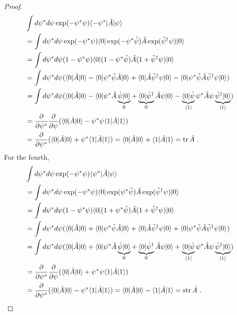 \begin{proof}
\begin{equation*}
\begin{aligned}
            & \int d\psi^* d\psi \exp(-\psi^* \psi) \langle-\psi^*\vert  \hat A \vert\psi\rangle \\ & = \int d\psi^* d\psi \exp(-\psi^* \psi)  \langle0\vert \exp(- \psi^* \hat \psi) \hat A \exp(\hat \psi^\dagger \psi) \vert0\rangle \\ & = \int d\psi^* d\psi (1 - \psi^* \psi) \langle0\vert (1 - \psi^* \hat \psi) \hat A (1 + \hat \psi^\dagger \psi) \vert0\rangle \\ & = \int d\psi^* d\psi (\langle0\vert \hat A \vert0\rangle - \langle0\vert \psi^* \hat \psi \hat A \vert0\rangle + \langle0\vert \hat A \hat \psi^\dagger \psi \vert0\rangle - \langle0\vert \psi^* \hat \psi \hat A \hat \psi^\dagger \psi \vert0\rangle) \\ & = \int d\psi^* d\psi (\langle0\vert \hat A \vert0\rangle - \langle0\vert \psi^* \hat A \underbrace{\hat \psi \vert0\rangle}_0 + \underbrace{\langle0\vert \hat \psi^\dagger}_0 \hat A \psi \vert0\rangle - \underbrace{\langle0\vert \hat \psi}_{\langle1\vert} \psi^* \hat A \psi \underbrace{\hat \psi^\dagger \vert0\rangle}_{\vert1\rangle}) \\ & = \frac{\partial}{\partial\psi^*} \frac{\partial}{\partial\psi} (\langle0\vert \hat A \vert0\rangle - \psi^* \psi \langle1\vert \hat A \vert1\rangle) \\ & = \frac{\partial}{\partial\psi^*} (\langle0\vert \hat A \vert0\rangle + \psi^* \langle1\vert \hat A \vert1\rangle) = \langle0\vert \hat A \vert0\rangle + \langle1\vert \hat A \vert1\rangle = \operatorname{tr} \hat A ~.
        \end{aligned}
        \end{equation*}
        For the fourth, 
        \begin{equation*}
        \begin{aligned}
            & \int d\psi^* d\psi \exp(-\psi^* \psi) \langle\psi^*\vert  \hat A \vert\psi\rangle \\ & = \int d\psi^* d\psi \exp(-\psi^* \psi)  \langle0\vert \exp(\psi^* \hat \psi) \hat A \exp(\hat \psi^\dagger \psi) \vert0\rangle \\ & = \int d\psi^* d\psi (1 - \psi^* \psi) \langle0\vert (1 + \psi^* \hat \psi) \hat A (1 + \hat \psi^\dagger \psi) \vert0\rangle \\ & = \int d\psi^* d\psi (\langle0\vert \hat A \vert0\rangle + \langle0\vert \psi^* \hat \psi \hat A \vert0\rangle + \langle0\vert \hat A \hat \psi^\dagger \psi \vert0\rangle + \langle0\vert \psi^* \hat \psi \hat A \hat \psi^\dagger \psi \vert0\rangle) \\ & = \int d\psi^* d\psi (\langle0\vert \hat A \vert0\rangle + \langle0\vert \psi^* \hat A \underbrace{\hat \psi \vert0\rangle}_0 + \underbrace{\langle0\vert \hat \psi^\dagger}_0 \hat A \psi \vert0\rangle + \underbrace{\langle0\vert \hat \psi}_{\langle1\vert} \psi^* \hat A \psi \underbrace{\hat \psi^\dagger \vert0\rangle}_{\vert1\rangle}) \\ & = \frac{\partial}{\partial\psi^*} \frac{\partial}{\partial\psi} (\langle0\vert \hat A \vert0\rangle + \psi^* \psi \langle1\vert \hat A \vert1\rangle) \\ & = \frac{\partial}{\partial\psi^*} (\langle0\vert \hat A \vert0\rangle - \psi^* \langle1\vert \hat A \vert1\rangle) = \langle0\vert \hat A \vert0\rangle - \langle1\vert \hat A \vert1\rangle = \operatorname{str} \hat A ~.
        \end{aligned}
        \end{equation*}
    \end{proof}

